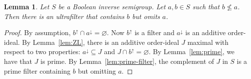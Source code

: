 \documentclass[a4paper]{amsart}
\newtheorem{lemma}[theorem]{Lemma}
\begin{document}
\begin{lemma}\label{lem:crucial} Let $S$ be a Boolean inverse semigroup.
Let $a,b \in S$ such that $b \nleq a$.
Then there is an ultrafilter that contains $b$ but omits $a$.
\end{lemma} 
\begin{proof} By assumption, $b^{\uparrow} \cap a^{\downarrow} = \varnothing$.
Now $b^{\uparrow}$ is a filter and $a^{\downarrow}$ is an additive order-ideal.
By Lemma~\ref{lem:ZL}, there is an additive order-ideal $J$ maximal with respect to two properties:
$a^{\downarrow} \subseteq J$ and $J \cap b^{\uparrow} = \varnothing$.
By Lemma~\ref{lem:prime}, we have that $J$ is prime.
By Lemma~\ref{lem:prime-filter}, the complement of $J$ in $S$ is a prime filter 
containing $b$ but omitting $a$.
\end{proof}
\end{document}
